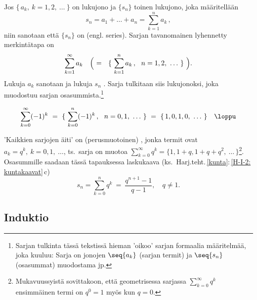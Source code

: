 Jos $\{\,a_k,\ k = 1,2,\ \ldots\ \}$ on lukujono ja $\{s_n\}$ toinen lukujono, joka
määritellään
\[
s_n = a_1 + \ldots + a_n = \sum_{k=1}^{n} a_k\,,
\]
niin sanotaan että $\{s_n\}$ on  (engl. series). Sarjan tavanomainen lyhennetty 
merkintätapa on
\[
\sum_{k=1}^{\infty} a_k \quad \Bigl(\ = \ \ \{\ \sum_{k=1}^{n} a_k\,,\ \ n = 1,2,\ \ldots\ \}\ 
\Bigr).
\]
Lukuja $a_k$ sanotaan  ja lukuja $s_n$ . Sarja
tulkitaan siis lukujonoksi, joka muodostuu sarjan osasummista.\footnote[2]{Sarjan tulkinta tässä
tekstissä hieman 'oikoo' sarjan formaalia määritelmää, joka kuuluu: Sarja on jonojen $\seq{a_k}$
(sarjan termit) ja $\seq{s_n}$ (osasummat) muodostama j\pain{ono}p\pain{ari}.}
\begin{Exa}
\[
\sum_{k=0}^{\infty} (-1)^k\ =\ \{\ \sum_{k=0}^{n} (-1)^k\,,\ \ n 
                            = 0,1,\ \ldots\ \}\ = \ \{\,1,0,1,0,\ \ldots\ \} \quad \loppu
\] 
\end{Exa}
'Kaikkien sarjojen äiti' on (perusmuotoinen)
, jonka termit ovat $a_k = q^k,\ k = 0,1,\ \ldots$, ts.\ sarja on muotoa 
$\sum_{k=0}^\infty q^k = \{1,1+q,1+q+q^2,\ \ldots\,\}$\footnote[3]{Mukavuussyistä sovittakoon,
että geometrisessa sarjassa $\sum_{k=0}^\infty q^k$ ensimmäinen termi on $q^0 = 1$ myös kun 
$q=0$.}. Osasummille saadaan tässä tapauksessa laskukaava
(ks.\ Harj.teht.\,\ref{kunta}:\,\ref{H-I-2: kuntakaavat}\,c)
\[
\boxed{\ s_n = \sum_{k=0}^n q^k\ =\ \dfrac{q^{n+1}-1}{q-1}, \quad q \neq 1.\ }
\]

\subsection*{Induktio}
%

